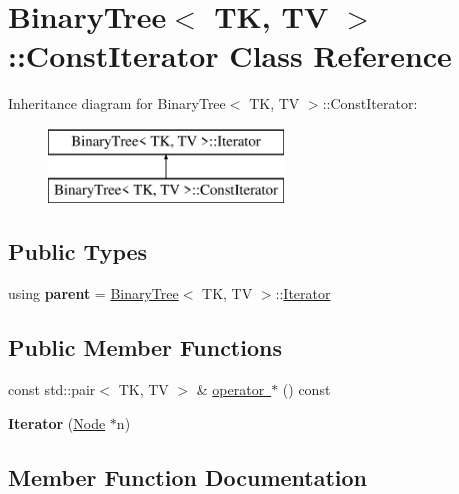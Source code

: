 \hypertarget{classBinaryTree_1_1ConstIterator}{}\section{Binary\+Tree$<$ TK, TV $>$\+::Const\+Iterator Class Reference}
\label{classBinaryTree_1_1ConstIterator}
Inheritance diagram for Binary\+Tree$<$ TK, TV $>$\+::Const\+Iterator\+:\begin{figure}[H]
\begin{center}
\leavevmode
\includegraphics[height=2.000000cm]{classBinaryTree_1_1ConstIterator}
\end{center}
\end{figure}
\subsection*{Public Types}
\begin{DoxyCompactItemize}
\item 
\mbox{\label{classBinaryTree_1_1ConstIterator_a21ac96e3cb6cbf1ec58eec8bea67615c}} 
using {\bfseries parent} = \mbox{\hyperlink{classBinaryTree}{Binary\+Tree}}$<$ TK, TV $>$\+::\mbox{\hyperlink{classBinaryTree_1_1Iterator}{Iterator}}
\end{DoxyCompactItemize}
\subsection*{Public Member Functions}
\begin{DoxyCompactItemize}
\item 
const std\+::pair$<$ TK, TV $>$ \& \mbox{\hyperlink{classBinaryTree_1_1ConstIterator_a5da9f65b0420c2eedf2b86cd9df9093e}{operator $\ast$}} () const
\item 
\mbox{\label{classBinaryTree_1_1ConstIterator_af796ad5392a36091e37b0fe4b8f40505}} 
{\bfseries Iterator} (\mbox{\hyperlink{structBinaryTree_1_1Node}{Node}} $\ast$n)
\end{DoxyCompactItemize}


\subsection{Member Function Documentation}
\mbox{\label{classBinaryTree_1_1ConstIterator_a5da9f65b0420c2eedf2b86cd9df9093e}} 
